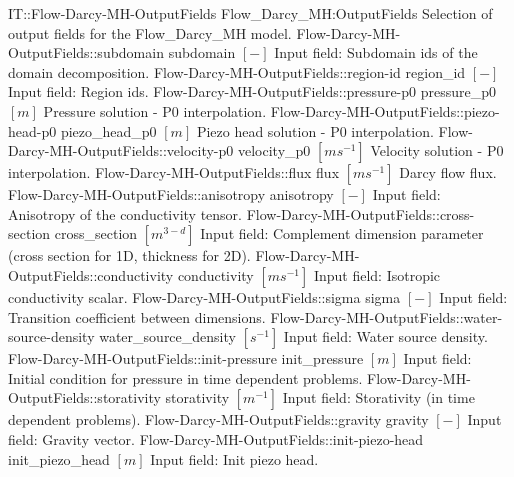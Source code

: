 \begin{SelectionType}
	{IT::Flow-Darcy-MH-OutputFields}
	{Flow{\_}Darcy{\_}MH:OutputFields}
	{{{Selection of output fields for the Flow{\_}Darcy{\_}MH model.}%
}}
		\SelectionItem
			{Flow-Darcy-MH-OutputFields::subdomain}
			{subdomain}
			{{{}{$[-]$}{ Input field: Subdomain ids of the domain decomposition.}%
}}
		\SelectionItem
			{Flow-Darcy-MH-OutputFields::region-id}
			{region{\_}id}
			{{{}{$[-]$}{ Input field: Region ids.}%
}}
		\SelectionItem
			{Flow-Darcy-MH-OutputFields::pressure-p0}
			{pressure{\_}p0}
			{{{}{$[m]$}{ Pressure solution - P0 interpolation.}%
}}
		\SelectionItem
			{Flow-Darcy-MH-OutputFields::piezo-head-p0}
			{piezo{\_}head{\_}p0}
			{{{}{$[m]$}{ Piezo head solution - P0 interpolation.}%
}}
		\SelectionItem
			{Flow-Darcy-MH-OutputFields::velocity-p0}
			{velocity{\_}p0}
			{{{}{$[ms^{-1}]$}{ Velocity solution - P0 interpolation.}%
}}
		\SelectionItem
			{Flow-Darcy-MH-OutputFields::flux}
			{flux}
			{{{}{$[ms^{-1}]$}{ Darcy flow flux.}%
}}
		\SelectionItem
			{Flow-Darcy-MH-OutputFields::anisotropy}
			{anisotropy}
			{{{}{$[-]$}{ Input field: Anisotropy of the conductivity tensor.}%
}}
		\SelectionItem
			{Flow-Darcy-MH-OutputFields::cross-section}
			{cross{\_}section}
			{{{}{$[m^{3-d}]$}{ Input field: Complement dimension parameter (cross section for 1D, thickness for 2D).}%
}}
		\SelectionItem
			{Flow-Darcy-MH-OutputFields::conductivity}
			{conductivity}
			{{{}{$[ms^{-1}]$}{ Input field: Isotropic conductivity scalar.}%
}}
		\SelectionItem
			{Flow-Darcy-MH-OutputFields::sigma}
			{sigma}
			{{{}{$[-]$}{ Input field: Transition coefficient between dimensions.}%
}}
		\SelectionItem
			{Flow-Darcy-MH-OutputFields::water-source-density}
			{water{\_}source{\_}density}
			{{{}{$[s^{-1}]$}{ Input field: Water source density.}%
}}
		\SelectionItem
			{Flow-Darcy-MH-OutputFields::init-pressure}
			{init{\_}pressure}
			{{{}{$[m]$}{ Input field: Initial condition for pressure in time dependent problems.}%
}}
		\SelectionItem
			{Flow-Darcy-MH-OutputFields::storativity}
			{storativity}
			{{{}{$[m^{-1}]$}{ Input field: Storativity (in time dependent problems).}%
}}
		\SelectionItem
			{Flow-Darcy-MH-OutputFields::gravity}
			{gravity}
			{{{}{$[-]$}{ Input field: Gravity vector.}%
}}
		\SelectionItem
			{Flow-Darcy-MH-OutputFields::init-piezo-head}
			{init{\_}piezo{\_}head}
			{{{}{$[m]$}{ Input field: Init piezo head.}%
}}
\end{SelectionType}
